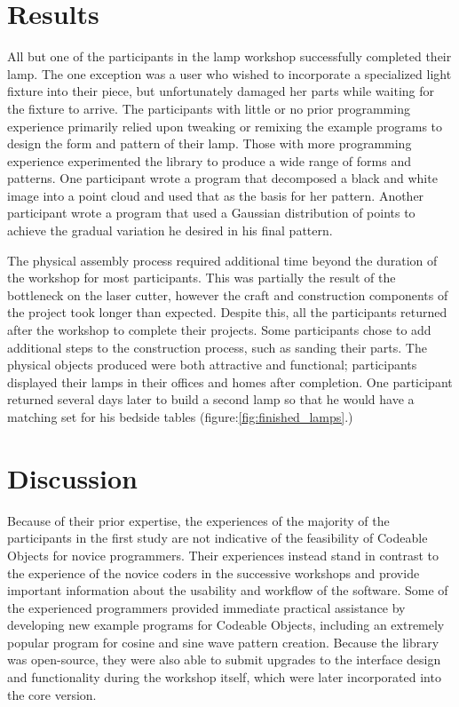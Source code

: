 \section{ Results}
All but one of the participants in the lamp workshop successfully completed their lamp. The one exception was a user who wished to incorporate a specialized light fixture into their piece, but unfortunately damaged her parts while waiting for the fixture to arrive. The participants with little or no prior programming experience primarily relied upon tweaking or remixing the example programs to design the form and pattern of their lamp. Those with more programming experience experimented the library to produce a wide range of forms and patterns. One participant wrote a program that decomposed a black and white image into a point cloud and used that as the basis for her pattern. Another participant wrote a program that used a Gaussian distribution of points to achieve the gradual variation he desired in his final pattern. 

 The physical assembly process required additional time beyond the duration of the workshop for most participants. This was partially the result of the bottleneck on the laser cutter, however the craft and construction components of the project took longer than expected. Despite this, all the participants returned after the workshop to complete their projects. Some participants chose to add additional steps to the construction process, such as sanding their parts. The physical objects produced were both attractive and functional; participants displayed their lamps in their offices and homes after completion. One participant returned several days later to build a second lamp so that he would have a matching set for his bedside tables (figure:\ref{fig:finished_lamps}.)		
		
		
\section{Discussion}

Because of their prior expertise, the experiences of the majority of the participants in the first study are not indicative of the feasibility of Codeable Objects for novice programmers. Their experiences instead stand in contrast to the experience of the novice coders in the successive workshops and provide important information about the usability and workflow of the software. Some of the experienced programmers provided immediate practical assistance by developing new example programs for Codeable Objects, including an extremely popular program for cosine and sine wave pattern creation. Because the library was open-source, they were also able to submit upgrades to the interface design and functionality during the workshop itself, which were later incorporated into the core version.

